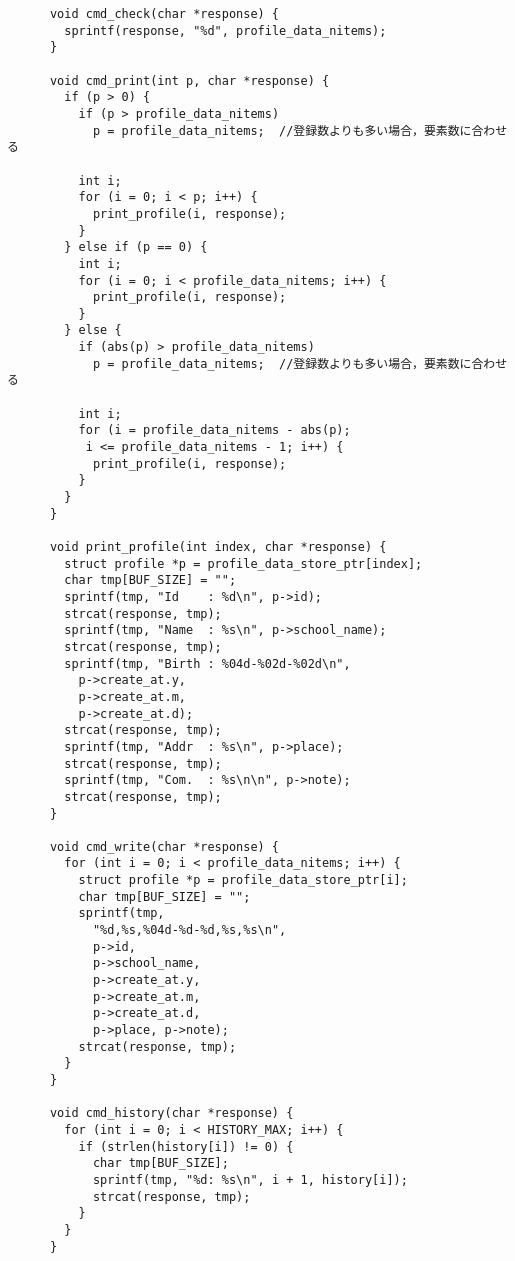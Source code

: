 \documentclass[11pt]{jsarticle}
\begin{document}
\begin{verbatim}
      void cmd_check(char *response) { 
        sprintf(response, "%d", profile_data_nitems);
      }

      void cmd_print(int p, char *response) {
        if (p > 0) {
          if (p > profile_data_nitems)
            p = profile_data_nitems;  //登録数よりも多い場合，要素数に合わせる
      
          int i;
          for (i = 0; i < p; i++) {
            print_profile(i, response);
          }
        } else if (p == 0) {
          int i;
          for (i = 0; i < profile_data_nitems; i++) {
            print_profile(i, response);
          }
        } else {
          if (abs(p) > profile_data_nitems)
            p = profile_data_nitems;  //登録数よりも多い場合，要素数に合わせる
      
          int i;
          for (i = profile_data_nitems - abs(p);
           i <= profile_data_nitems - 1; i++) {
            print_profile(i, response);
          }
        }
      }
      
      void print_profile(int index, char *response) {
        struct profile *p = profile_data_store_ptr[index];
        char tmp[BUF_SIZE] = "";
        sprintf(tmp, "Id    : %d\n", p->id);
        strcat(response, tmp);
        sprintf(tmp, "Name  : %s\n", p->school_name);
        strcat(response, tmp);
        sprintf(tmp, "Birth : %04d-%02d-%02d\n", 
          p->create_at.y, 
          p->create_at.m,
          p->create_at.d);
        strcat(response, tmp);
        sprintf(tmp, "Addr  : %s\n", p->place);
        strcat(response, tmp);
        sprintf(tmp, "Com.  : %s\n\n", p->note);
        strcat(response, tmp);
      }
      
      void cmd_write(char *response) {
        for (int i = 0; i < profile_data_nitems; i++) {
          struct profile *p = profile_data_store_ptr[i];
          char tmp[BUF_SIZE] = "";
          sprintf(tmp, 
            "%d,%s,%04d-%d-%d,%s,%s\n", 
            p->id, 
            p->school_name,
            p->create_at.y, 
            p->create_at.m, 
            p->create_at.d, 
            p->place, p->note);
          strcat(response, tmp);
        }
      }
      
      void cmd_history(char *response) {
        for (int i = 0; i < HISTORY_MAX; i++) {
          if (strlen(history[i]) != 0) {
            char tmp[BUF_SIZE];
            sprintf(tmp, "%d: %s\n", i + 1, history[i]);
            strcat(response, tmp);
          }
        }
      }
\end{verbatim}
\end{document}

